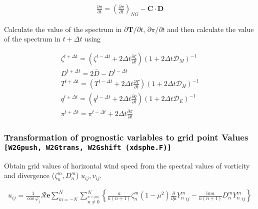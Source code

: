 \begin{eqnarray}
  \frac{\partial \pi}{\partial t}
      =   \left( \frac{\partial \pi}
                        {\partial t}       \right)_{NG}  
         - {\mathbf{C}} \cdot {\mathbf{D}}
\end{eqnarray}

Calculate the value of the spectrum in
\(\partial {\mathbf{T}}/\partial t\), \(\partial \pi/\partial t\) and
then calculate the value of the spectrum in \(t+\Delta t\) using

\begin{eqnarray}
  \zeta^{t+\Delta t}  =  \left( \zeta^{t-\Delta t}
                                +   2 \Delta t \frac{\partial{\zeta}}{\partial {t}} \right)
                          ( 1 + 2 \Delta t {\mathcal D}_M )^{-1} \\
  D^{t+\Delta t}  =  2 \bar{D} - D^{t-\Delta t}\\
  T^{t+\Delta t}  =  \left( T^{t-\Delta t}
                                +  2 \Delta t  \frac{\partial{T}}{\partial {t}} \right)
                          ( 1 + 2 \Delta t {\mathcal D}_H )^{-1} \\
  q^{t+\Delta t}  =  \left( q^{t-\Delta t}
                                +  2 \Delta t \frac{\partial{q}}{\partial {t}} \right)
                          ( 1 + 2 \Delta t {\mathcal D}_E )^{-1} \\
\pi^{t+\Delta t}  =  \pi^{t-\Delta t}
                                +  2 \Delta t \frac{\partial{\pi}}{\partial {t}}
\end{eqnarray}

\hypertarget{transformation-of-prognostic-variables-to-grid-point-values-w2gpush-w2gtrans-w2gshift-xdsphe.f}{%
\subsubsection{\texorpdfstring{Transformation of prognostic variables to
grid point Values
\texttt{{[}W2Gpush,\ W2Gtrans,\ W2Gshift\ (xdsphe.F){]}}}{Transformation of prognostic variables to grid point Values {[}W2Gpush, W2Gtrans, W2Gshift (xdsphe.F){]}}}\label{transformation-of-prognostic-variables-to-grid-point-values-w2gpush-w2gtrans-w2gshift-xdsphe.f}}

Obtain grid values of horizontal wind speed from the spectral values of
vorticity and divergence (\(\zeta_n^m, D_n^m\)) \(u_{ij}, v_{ij}\).

\begin{eqnarray}
  u_{ij}
  =  \frac{1}{\cos \varphi_j}
     {\mathcal R}{\mathbf{e}} \sum_{m=-N}^{N}
                       \sum_{\stackrel{n=|m|}{n \neq 0}}^{N}
    \left\{
             \frac{a}{n(n+1)} \zeta_n^m
            (1-\mu^{2}) \frac{\partial{}}{\partial {\mu}} {Y_n^m}_{ij}
          -  \frac{\mathrm{i}m a}{n(n+1)} D_n^m {Y_n^m}_{ij}
    \right\}
\end{eqnarray}

